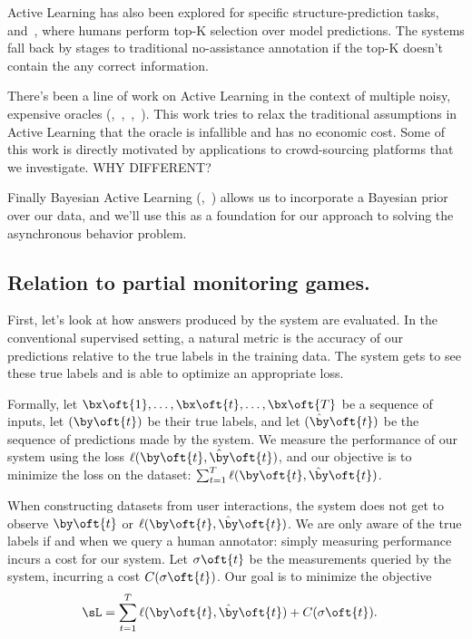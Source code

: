 Active Learning has also been explored for specific structure-prediction tasks,~\cite{roth2006active} and~\cite{culotta2005reducing}, where humans perform top-K selection over model predictions.
The systems fall back by stages to traditional no-assistance annotation if the top-K doesn't contain the any correct information.

There's been a line of work on Active Learning in the context of multiple noisy, expensive oracles (\cite{yan2011active},~\cite{donmez2008proactive},~\cite{golovin2010near},~\cite{vijayanarasimhan2014large}).
This work tries to relax the traditional assumptions in Active Learning that the oracle is infallible and has no economic cost.
Some of this work is directly motivated by applications to crowd-sourcing platforms that we investigate.
WHY DIFFERENT?


Finally Bayesian Active Learning (\cite{golovin2010near},~\cite{tong2000active}) allows us to incorporate a Bayesian prior over our data, and we'll use this as a foundation for our approach to solving the asynchronous behavior problem.

\subsection{Relation to partial monitoring games.}

First, let's look at how answers produced by the system are evaluated.
In the conventional supervised setting, a natural metric is the accuracy of our predictions relative to the true labels in the training data.
The system gets to see these true labels and is able to optimize an appropriate loss.

Formally, let $\bx\oft{1}, \dots, \bx\oft{t}, \dots, \bx\oft{T}$ be a sequence of inputs, 
let $(\by\oft{t})$ be their true labels,
and let $(\byt\oft{t})$ be the sequence of predictions made by the system.
We measure the performance of our system using the loss $\ell(\by\oft{t}, \byt\oft{t})$, and our objective is to minimize the loss on the dataset: $\sum_{t=1}^T \ell(\by\oft{t}, \byt\oft{t})$.

When constructing datasets from user interactions, the system does not get to observe $\by\oft{t}$ or $\ell(\by\oft{t}, \byt\oft{t})$.
We are only aware of the true labels if and when we query a human annotator: simply measuring performance incurs a cost for our system.
Let $\sigma\oft{t}$ be the measurements queried by the system, incurring a cost $C(\sigma\oft{t})$.
Our goal is to minimize the objective
\begin{align*}
  \sL &= \sum_{t=1}^T \ell(\by\oft{t}, \byt\oft{t}) + C(\sigma\oft{t}).
\end{align*}
